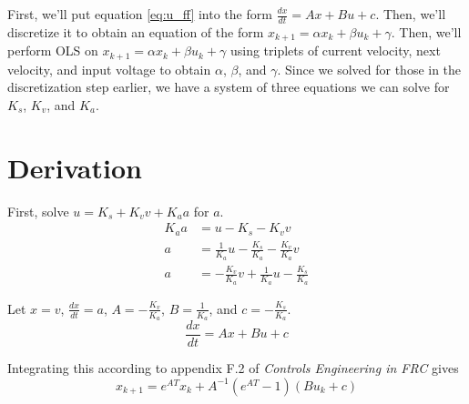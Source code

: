 \documentclass[10pt,conference,compsoc]{IEEEtran}
\begin{document}
First, we'll put equation \eqref{eq:u_ff} into the form
$\frac{dx}{dt} = Ax + Bu + c$. Then, we'll discretize it to obtain an equation
of the form $x_{k+1} = \alpha x_k + \beta u_k + \gamma$. Then, we'll perform OLS
on $x_{k+1} = \alpha x_k + \beta u_k + \gamma$ using triplets of current
velocity, next velocity, and input voltage to obtain $\alpha$, $\beta$, and
$\gamma$. Since we solved for those in the discretization step earlier, we have
a system of three equations we can solve for $K_s$, $K_v$, and $K_a$.

\section{Derivation}

First, solve $u = K_s + K_v v + K_a a$ for $a$.
\begin{align*}
  K_a a &= u - K_s - K_v v \\
  a &= \frac{1}{K_a} u - \frac{K_s}{K_a} - \frac{K_v}{K_a} v \\
  a &= -\frac{K_v}{K_a} v + \frac{1}{K_a} u - \frac{K_s}{K_a}
\end{align*}

Let $x = v$, $\frac{dx}{dt} = a$, $A = -\frac{K_v}{K_a}$, $B = \frac{1}{K_a}$,
and $c = -\frac{K_s}{K_a}$.
\begin{equation*}
  \frac{dx}{dt} = Ax + Bu + c
\end{equation*}

Integrating this according to appendix F.2 of \textit{Controls Engineering in
FRC} \cite{bib:controls-in-frc} gives
\begin{equation*}
  x_{k+1} = e^{AT} x_k + A^{-1} (e^{AT} - 1) (Bu_k + c)
\end{equation*}
\end{document}

